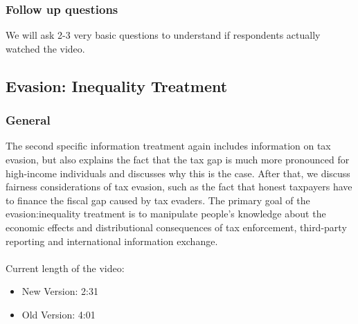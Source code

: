 \documentclass[11pt]{article}
\begin{document}
\subsubsection*{Follow up questions}
We will ask 2-3 very basic questions to understand if respondents actually watched the video.
\subsection{Evasion: Inequality Treatment}
\subsubsection*{General}
The second specific information treatment again includes information on tax evasion, but also explains the fact that the tax gap is much more pronounced for high-income individuals and discusses why this is the case. After that, we discuss fairness considerations of tax evasion, such as the fact that honest taxpayers have to finance the fiscal gap caused by tax evaders. The primary goal of the evasion:inequality treatment is to manipulate people’s knowledge about the economic effects and distributional consequences of tax enforcement, third-party reporting and international information exchange.
\\ \\
Current length of the video: 
\begin{itemize}
    \item New Version: 2:31
    \item Old Version: 4:01
\end{itemize}
\end{document}
